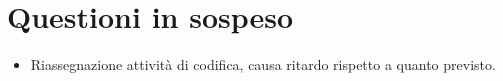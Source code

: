 \documentclass[../verbale-2017-03-31.tex]{subfiles}
\begin{document}
	\section{Questioni in sospeso} 
	\begin{itemize}
		\item Riassegnazione attività di codifica, causa ritardo rispetto a quanto previsto.
	\end{itemize}
\end{document}
